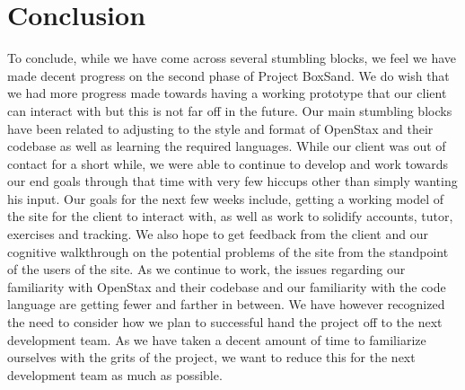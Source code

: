 \documentclass[onecolumn, draftclsnofoot,10pt, compsoc]{IEEEtran}
\begin{document}
 \section{Conclusion}
 To conclude, while we have come across several stumbling blocks, we feel we have made decent progress on the second phase of Project BoxSand. We do wish that we had more progress made towards having a working prototype that our client can interact with but this is not far off in the future. Our main stumbling blocks have been related to adjusting to the style and format of OpenStax and their codebase as well as learning the required languages. While our client was out of contact for a short while, we were able to continue to develop and work towards our end goals through that time with very few hiccups other than simply wanting his input. Our goals for the next few weeks include, getting a working model of the site for the client to interact with, as well as work to solidify accounts, tutor, exercises and tracking. We also hope to get feedback from the client and our cognitive walkthrough on the potential problems of the site from the standpoint of the users of the site. As we continue to work, the issues regarding our familiarity with OpenStax and their codebase and our familiarity with the code language are getting fewer and farther in between. We have however recognized the need to consider how we plan to successful hand the project off to the next development team. As we have taken a decent amount of time to familiarize ourselves with the grits of the project, we want to reduce this for the next development team as much as possible.
\end{document}
